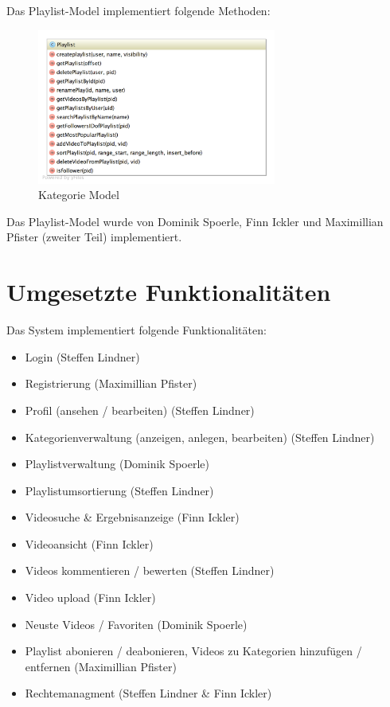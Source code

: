 \pm

Das Playlist-Model implementiert folgende Methoden:

\begin{figure}[H]
		\centering
        \includegraphics[width=0.7\textwidth]{./UML/Playlist.png}
    \caption{Kategorie Model}
\end{figure}

 Das Playlist-Model wurde von Dominik Spoerle, Finn Ickler und Maximillian Pfister (zweiter Teil) implementiert.


\section{Umgesetzte Funktionalitäten}
Das System implementiert folgende Funktionalitäten:

\begin{itemize}
	\item Login (Steffen Lindner)
	\item Registrierung (Maximillian Pfister)
	\item Profil (ansehen / bearbeiten) (Steffen Lindner)
	\item Kategorienverwaltung (anzeigen, anlegen, bearbeiten) (Steffen Lindner)
	\item Playlistverwaltung (Dominik Spoerle)
	\item Playlistumsortierung (Steffen Lindner)
	\item Videosuche \& Ergebnisanzeige (Finn Ickler)
	\item Videoansicht (Finn Ickler)
	\item Videos kommentieren / bewerten (Steffen Lindner)
	\item Video upload (Finn Ickler)
	\item Neuste Videos / Favoriten (Dominik Spoerle)
	\item Playlist abonieren / deabonieren, Videos zu Kategorien hinzufügen / entfernen (Maximillian Pfister)
	\item Rechtemanagment (Steffen Lindner \& Finn Ickler)
\end{itemize}


